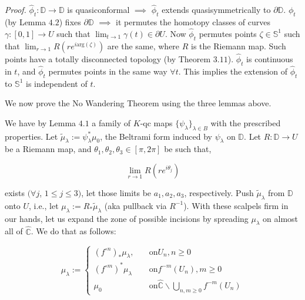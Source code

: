 \documentclass[11pt,a4paper]{article}
\begin{document}

        \textit{Proof.} $\hat{\phi}_t: \mathbb{D} \rightarrow \mathbb{D}$ is quasiconformal $\implies$ $\hat{\phi}_t$ extends quasisymmetrically to $\partial \mathbb{D}$. $\phi_t$ (by Lemma $4.2$) fixes $\partial \mathbb{D}$ $\implies$ it permutes the homotopy classes of curves $\gamma:[0,1]\rightarrow U$ such that $\lim_{t\rightarrow 1}{\gamma(t)} \in \partial U$. Now $\hat{\phi}_t$ permutes points $\zeta \in \mathbb{S}^1$ such that $\lim_{r\rightarrow 1}{R(re^{i\text{arg}(\zeta)})}$ are the same, where $R$ is the Riemann map. Such points have a totally disconnected topology (by Theorem $3.11$). $\hat{\phi}_t$ is continuous in $t$, and $\hat{\phi}_t$ permutes points in the same way $\forall t$. This implies the extension of $\hat{\phi}_t$ to $\mathbb{S}^1$ is independent of $t$.




        We now prove the No Wandering Theorem using the three lemmas above.

        We have by Lemma $4.1$ a family of $K$-qc maps $\{\psi_{\lambda}\}_{\lambda \in B}$ with the prescribed properties. Let $\tilde{\mu}_{\lambda}:= \psi_{\lambda}^*\mu_0$, the Beltrami form induced by $\psi_{\lambda}$ on $\mathbb{D}$. Let $R:\mathbb{D} \rightarrow U$ be a Riemann map, and $\theta_1, \theta_2, \theta_3 \in [\pi, 2\pi]$ be such that,

        $$
        \lim_{r \rightarrow 1}{R(re^{i\theta_j})}$$


        exists $(\forall j$, $1\leq j\leq 3)$, let those limits be $a_1, a_2, a_3$, respectively. Push $\tilde{\mu}_{\lambda}$ from $\mathbb{D}$ onto $U$, i.e., let $\mu_{\lambda}:= R_*\tilde{\mu}_{\lambda}$ (aka pullback via $R^{-1}$). With these scalpels firm in our hands, let us expand the zone of possible incisions by spreading $\mu_{\lambda}$ on almost all of $\hat{\mathbb{C}}$. We do that as follows:

        $$\mu_{\lambda} :=
        \begin{cases}
        (f^{\circ n})_*\mu_{\lambda}, &\quad\text{on}  U_n,  n\geq 0\\
        (f^{\circ m})^*\mu_{\lambda} &\quad\text{on}   f^{-m}(U_n),  m\geq 0\\
         \mu_0 &\quad\text{on}   \hat{\mathbb{C}}\backslash \bigcup_{n,m\geq 0}{f^{-m}(U_n)}
        \end{cases}$$
\end{document}
